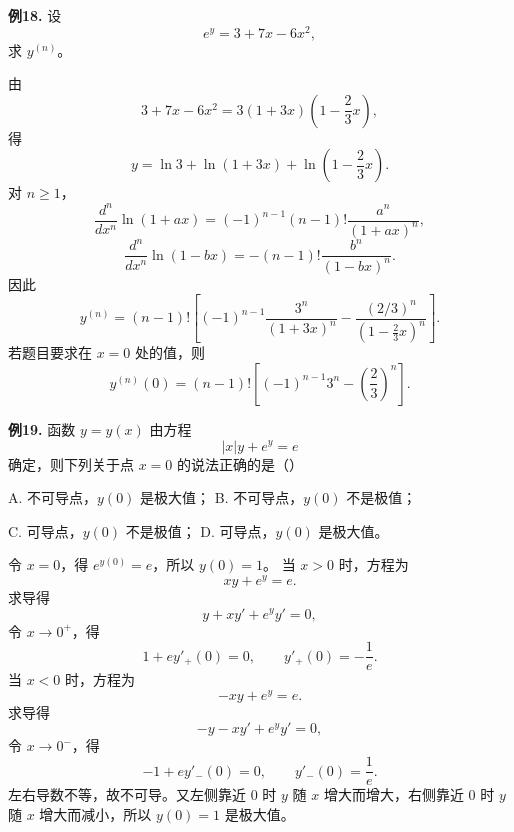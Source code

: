 \begin{problemblock}
\textbf{例18.} 设
\[
e^y=3+7x-6x^2,
\]
求 \(y^{(n)}\)。
\end{problemblock}
\begin{solutionblock}
由
\[
3+7x-6x^2=3(1+3x)\left(1-\frac23x\right),
\]
得
\[
y=\ln3+
\ln(1+3x)+\ln\left(1-\frac23x\right).
\]
对 \(n\ge1\)，
\[
\frac{d^n}{dx^n}\ln(1+ax)=(-1)^{n-1}(n-1)!\frac{a^n}{(1+ax)^n},
\]
\[
\frac{d^n}{dx^n}\ln(1-bx)=-(n-1)!\frac{b^n}{(1-bx)^n}.
\]
因此
\[
y^{(n)}=(n-1)!\left[(-1)^{n-1}\frac{3^n}{(1+3x)^n}
-\frac{(2/3)^n}{\left(1-\frac{2}{3}x\right)^n}\right].
\]
若题目要求在 \(x=0\) 处的值，则
\[
y^{(n)}(0)=(n-1)!\left[(-1)^{n-1}3^n-\left(\frac23\right)^n\right].
\]
\end{solutionblock}

\begin{problemblock}
\textbf{例19.} 函数 \(y=y(x)\) 由方程
\[
|x|y+e^y=e
\]
确定，则下列关于点 \(x=0\) 的说法正确的是（\quad）

A. 不可导点，\(y(0)\) 是极大值；
B. 不可导点，\(y(0)\) 不是极值；

C. 可导点，\(y(0)\) 不是极值；
D. 可导点，\(y(0)\) 是极大值。
\end{problemblock}
\begin{solutionblock}
令 \(x=0\)，得 \(e^{y(0)}=e\)，所以 \(y(0)=1\)。
当 \(x>0\) 时，方程为
\[
xy+e^y=e.
\]
求导得
\[
y+xy'+e^y y'=0,
\]
令 \(x\to0^+\)，得
\[
1+e y'_+(0)=0,
\qquad y'_+(0)=-\frac1e.
\]
当 \(x<0\) 时，方程为
\[
-xy+e^y=e.
\]
求导得
\[
-y-xy'+e^y y'=0,
\]
令 \(x\to0^-\)，得
\[
-1+e y'_-(0)=0,
\qquad y'_-(0)=\frac1e.
\]
左右导数不等，故不可导。又左侧靠近 0 时 \(y\) 随 \(x\) 增大而增大，右侧靠近 0 时 \(y\) 随 \(x\) 增大而减小，所以 \(y(0)=1\) 是极大值。
\end{solutionblock}

